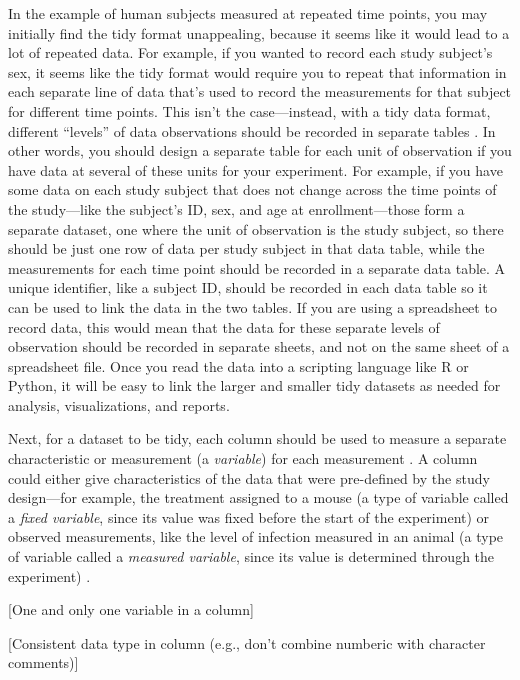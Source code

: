\documentclass[]{tufte-book}
\begin{document}
In the example of human subjects measured at repeated time points, you may
initially find the tidy format unappealing, because it seems like it would
lead to a lot of repeated data. For example, if you wanted to record each study
subject's sex, it seems like the tidy format would require you to repeat that
information in each separate line of data that's used to record the measurements
for that subject for different time points. This isn't the case---instead, with
a tidy data format, different ``levels'' of data observations should be recorded
in separate tables \citep{wickham2014tidy}. In other words, you should design a
separate table for each unit of observation if you have data at several of these
units for your experiment. For example, if you have some data on each study
subject that does not change across the time points of the study---like the
subject's ID, sex, and age at enrollment---those form a separate dataset, one
where the unit of observation is the study subject, so there should be just one
row of data per study subject in that data table, while the measurements for
each time point should be recorded in a separate data table. A unique
identifier, like a subject ID, should be recorded in each data table so it can
be used to link the data in the two tables. If you are using a spreadsheet to
record data, this would mean that the data for these separate levels of
observation should be recorded in separate sheets, and not on the same sheet of
a spreadsheet file. Once you read the data into a scripting language like R or
Python, it will be easy to link the larger and smaller tidy datasets as needed
for analysis, visualizations, and reports.

Next, for a dataset to be tidy, each column should be used
to measure a separate characteristic or measurement (a \emph{variable}) for each
measurement \citep{wickham2014tidy}. A column could either give characteristics of
the data that were pre-defined by the study design---for example, the treatment
assigned to a mouse (a type of variable called a \emph{fixed variable}, since its
value was fixed before the start of the experiment) or observed measurements,
like the level of infection measured in an animal (a type of variable called a
\emph{measured variable}, since its value is determined through the experiment)
\citep{wickham2014tidy}.

{[}One and only one variable in a column{]}

{[}Consistent data type in column (e.g., don't combine numberic with character
comments){]}
\end{document}
